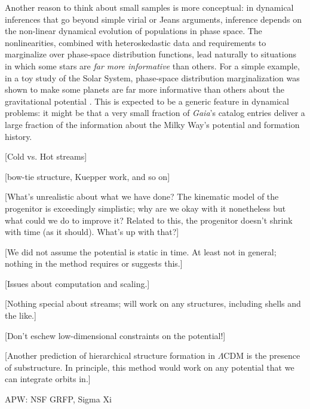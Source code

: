 \documentclass[letterpaper,12pt,preprint]{aastex}
\newcommand{\project}[1]{\textsl{#1}}
\newcommand{\gaia}{\project{Gaia}}
\begin{document}
Another reason to think about small samples is more conceptual:
in dynamical inferences that go beyond simple virial or Jeans arguments,
  inference depends on the non-linear dynamical evolution of populations in phase space.
The nonlinearities, combined with heteroskedastic data and requirements to marginalize over phase-space distribution functions,
  lead naturally to situations in which some stars are \emph{far more informative} than others.
For a simple example, in a toy study of the Solar System,
  phase-space distribution marginalization was shown to make some planets are far more informative than others
  about the gravitational potential \citep{bovy10}.
This is expected to be a generic feature in dynamical problems:
  it might be that a very small fraction of \gaia's catalog entries
  deliver a large fraction of the information about the Milky Way's potential and formation history.

[Cold vs. Hot streams]

[bow-tie structure, Kuepper work, and so on]

[What's unrealistic about what we have done?  The kinematic model of
  the progenitor is exceedingly simplistic; why are we okay with it
  nonetheless but what could we do to improve it?  Related to this,
  the progenitor doesn't shrink with time (as it should).  What's up
  with that?]

[We did not assume the potential is static in time.  At least not in
  general; nothing in the method requires or suggests this.]

[Issues about computation and scaling.]

[Nothing special about streams; will work on any structures, including
  shells and the like.]

[Don't eschew low-dimensional constraints on the potential!]

[Another prediction of hierarchical structure formation in $\Lambda$CDM is the presence of substructure. In principle, this method would work on any potential that we can integrate orbits in.]




\acknowledgements
APW: NSF GRFP, Sigma Xi
\end{document}
